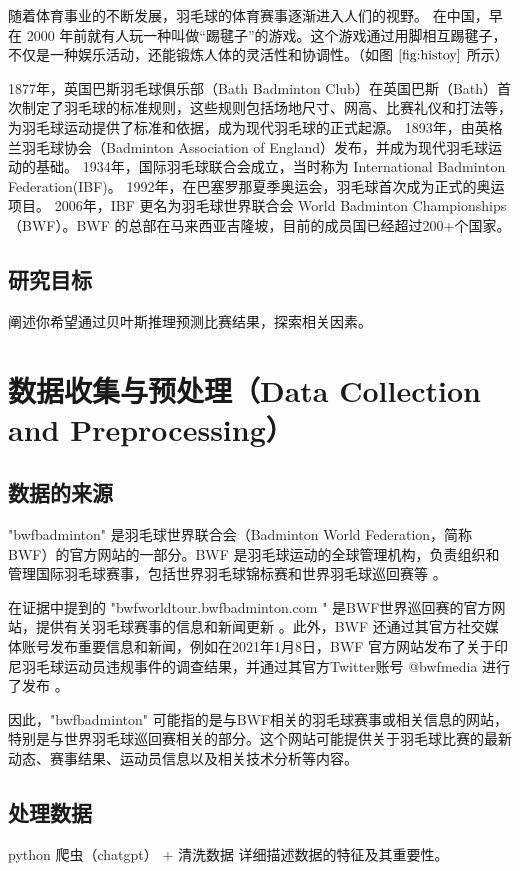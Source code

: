 \documentclass[12pt]{article}
\begin{document}
随着体育事业的不断发展，羽毛球的体育赛事逐渐进入人们的视野。
在中国，早在 2000 年前就有人玩一种叫做“踢毽子”的游戏。这个游戏通过用脚相互踢毽子，不仅是一种娱乐活动，还能锻炼人体的灵活性和协调性。（如图 $\ref{fig:histoy}$ 所示）

1877年，英国巴斯羽毛球俱乐部（Bath Badminton Club）在英国巴斯（Bath）首次制定了羽毛球的标准规则，这些规则包括场地尺寸、网高、比赛礼仪和打法等，为羽毛球运动提供了标准和依据，成为现代羽毛球的正式起源。
1893年，由英格兰羽毛球协会（Badminton Association of England）发布，并成为现代羽毛球运动的基础。
1934年，国际羽毛球联合会成立，当时称为 International Badminton Federation(IBF)。
1992年，在巴塞罗那夏季奥运会，羽毛球首次成为正式的奥运项目。
2006年，IBF 更名为羽毛球世界联合会 World Badminton Championships（BWF）。BWF 的总部在马来西亚吉隆坡，目前的成员国已经超过200+个国家。


\subsection{研究目标}
阐述你希望通过贝叶斯推理预测比赛结果，探索相关因素。


\section{数据收集与预处理（Data Collection and Preprocessing）}
\subsection{数据的来源}
"bwfbadminton" 是羽毛球世界联合会（Badminton World Federation，简称BWF）的官方网站的一部分。BWF 是羽毛球运动的全球管理机构，负责组织和管理国际羽毛球赛事，包括世界羽毛球锦标赛和世界羽毛球巡回赛等
。

在证据中提到的 "bwfworldtour.bwfbadminton.com " 是BWF世界巡回赛的官方网站，提供有关羽毛球赛事的信息和新闻更新
。此外，BWF 还通过其官方社交媒体账号发布重要信息和新闻，例如在2021年1月8日，BWF 官方网站发布了关于印尼羽毛球运动员违规事件的调查结果，并通过其官方Twitter账号 @bwfmedia 进行了发布
。

因此，"bwfbadminton" 可能指的是与BWF相关的羽毛球赛事或相关信息的网站，特别是与世界羽毛球巡回赛相关的部分。这个网站可能提供关于羽毛球比赛的最新动态、赛事结果、运动员信息以及相关技术分析等内容。


\subsection{处理数据}
python 爬虫（chatgpt） + 清洗数据
详细描述数据的特征及其重要性。
\end{document}
